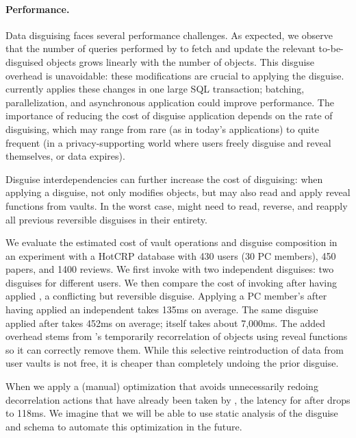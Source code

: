 \paragraph{Performance.}
\label{sec:perf}

Data disguising faces several performance challenges.
%
%
As expected, we observe that the number of queries performed by \sys to fetch and update
the relevant to-be-disguised objects grows linearly with the number of objects.
%
This disguise overhead is unavoidable: these modifications are crucial to applying the
disguise.
%
\sys currently applies these changes in one large SQL transaction; batching, parallelization,
and asynchronous application could improve performance.
%
The importance of reducing the cost of disguise application depends on the rate of
disguising, which may range from rare (as in today's applications) to quite frequent (in a
privacy-supporting world where users freely disguise and reveal themselves, or data expires).
%

%
Disguise interdependencies can further increase the cost of disguising: when applying a
disguise, \sys not only modifies objects, but may also read and apply reveal functions from
vaults.
%
In the worst case, \sys might need to read, reverse, and reapply all previous reversible
disguises in their entirety.
%

We evaluate the estimated cost of vault operations and disguise composition in an experiment
with a HotCRP database with 430 users (30 PC members), 450 papers, and 1400 reviews.
%
We first invoke \sys with two independent disguises: two \hrtbf disguises for different users.
%
We then compare the cost of invoking \hrtbf after having applied \hconfanon, a conflicting but reversible
disguise.
%
Applying a PC member's \hrtbf after having applied an independent \hrtbf takes 135ms on
average.
%
The same \hrtbf disguise applied after \hconfanon takes 452ms on average;
\hconfanon itself takes about 7,000ms.
%
The added overhead stems from \sys's temporarily recorrelation of objects
using reveal functions so it can correctly remove them.
%
While this selective reintroduction of data from user vaults is not free, it is cheaper than
completely undoing the prior \hconfanon disguise.
%

%
When we apply a (manual) optimization that avoids unnecessarily redoing decorrelation
actions that have already been taken by \hconfanon, the latency for \hrtbf after \hconfanon
drops to 118ms.
%
We imagine that we will be able to use static analysis of the disguise and schema to automate
this optimization in the future.
%
